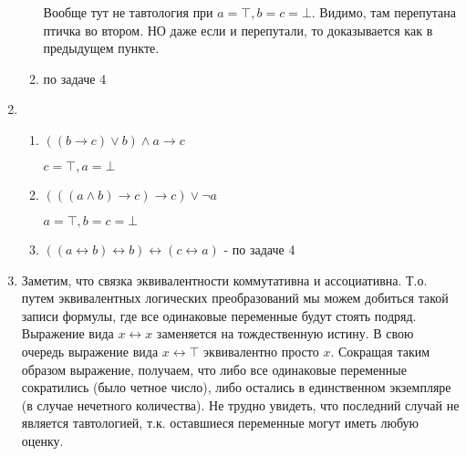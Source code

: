 \documentclass{article}
\begin{document}
\begin{enumerate}
\begin{enumerate}
      Вообще тут не тавтология при $a = \top, b = c = \bot$. Видимо,
      там перепутана птичка во втором. НО даже если и перепутали, то
      доказывается как в предыдущем пункте.
    \item по задаче 4
  \end{enumerate}

\item
  \begin{enumerate}
    \item $(( b \to c) \lor b) \land a \to c$

      $c = \top, a = \bot$
    \item $(((a \land b) \to c) \to c) \lor \neg a$

      $a = \top, b = c = \bot$

    \item $((a \leftrightarrow b) \leftrightarrow b) \leftrightarrow
      (c \leftrightarrow a)$ - по задаче 4
  \end{enumerate}

\item

  Заметим, что связка эквивалентности коммутативна и
  ассоциативна. Т.о. путем эквивалентных логических преобразований мы
  можем добиться такой записи формулы, где все одинаковые переменные будут
  стоять подряд. Выражение вида $x \leftrightarrow x$ заменяется на
  тождественную истину. В свою очередь выражение вида $x \leftrightarrow
  \top$ эквивалентно просто $x$. Сокращая таким образом выражение,
  получаем, что либо все одинаковые переменные сократились (было
  четное число), либо остались
  в единственном экземпляре (в случае нечетного количества). Не трудно
  увидеть, что последний случай не является тавтологией, т.к. оставшиеся
  переменные могут иметь любую оценку.
\end{enumerate}
\end{document}
